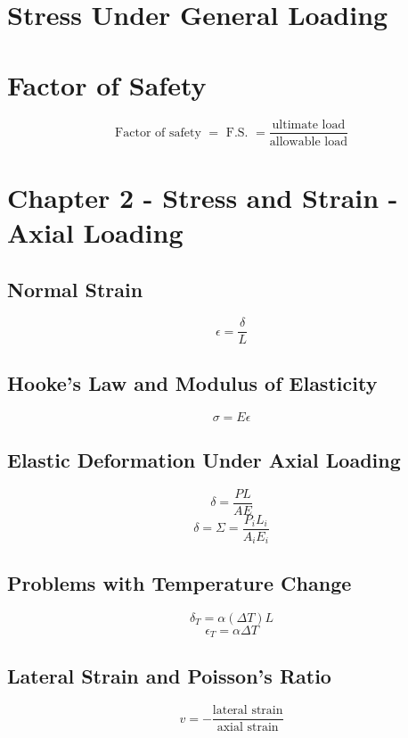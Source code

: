 \documentclass[10pt,landscape]{article}
\begin{document}
\begin{multicols}{3}
\section{Stress Under General Loading}
\section{Factor of Safety}
\begin{equation}
    \text{Factor of safety }=\text{ F.S. }=\frac{\text{ultimate load}}{\text{allowable load}}
\end{equation}

\section{Chapter 2 - Stress and Strain - Axial Loading}
\subsection{Normal Strain}
\begin{equation}
    \epsilon=\frac{\delta}{L}
\end{equation}
\subsection{Hooke's Law and Modulus of Elasticity}
\begin{equation}
    \sigma=E\epsilon
\end{equation}
\subsection{Elastic Deformation Under Axial Loading}
\begin{equation}
    \delta=\frac{PL}{AE}
\end{equation}
\begin{equation}
    \delta=\Sigma=\frac{P_iL_i}{A_iE_i}
\end{equation}
\subsection{Problems with Temperature Change}
\begin{equation}
    \delta_T=\alpha(\Delta T)L     
\end{equation}
\begin{equation}
    \epsilon_T=\alpha\Delta T
\end{equation}
\subsection{Lateral Strain and Poisson's Ratio}
\begin{equation}
    v=-\frac{\text{lateral strain}}{\text{axial strain}}
\end{equation}

\end{multicols}
\end{document}
